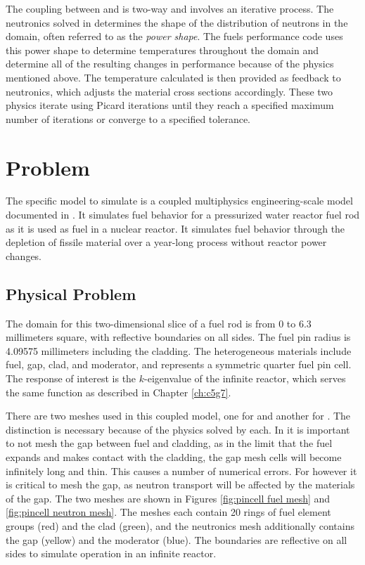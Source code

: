 The coupling between \rattlesnake{} and \bison{} is two-way and involves an iterative process.  The neutronics
solved in \rattlesnake{} determines the shape of the distribution of neutrons in the domain, often referred to
as the \emph{power shape}.  The fuels performance code uses this power shape to determine temperatures
throughout the domain and determine all of the resulting changes in performance because of the physics
mentioned above.  The temperature calculated is then provided as feedback to neutronics, which adjusts the
material cross sections accordingly.  These two physics iterate using Picard iterations until they reach a
specified maximum number of iterations or converge to a specified tolerance.

\section{Problem}

The specific model to simulate is a coupled multiphysics engineering-scale model documented in \cite{physormammoth}.  
It simulates fuel behavior for a pressurized
water reactor fuel rod as it is used as fuel in a nuclear reactor.  It simulates fuel behavior through the 
depletion of fissile material over a year-long process without reactor power changes.

\subsection{Physical Problem}
The domain for this two-dimensional slice of a fuel rod is from 0 to 6.3 millimeters square, with reflective
boundaries on all sides.
The fuel pin radius is 4.09575 millimeters including the cladding.
The heterogeneous materials include fuel, gap, clad, and
moderator, and represents a symmetric quarter fuel pin cell.  
The response of interest is the $k$-eigenvalue of the infinite reactor, which serves the same function as
described in Chapter \ref{ch:c5g7}.

There are two meshes used in this coupled model, one for \bison{} and another for \rattlesnake{}.  The distinction is
necessary because of the physics solved by each.  In \bison{} it is important to not mesh the gap between fuel
and cladding, as in the limit that the fuel expands and makes contact with the cladding, the gap mesh cells
will become infinitely long and thin.  This causes a number of numerical errors.  For \rattlesnake{} however
it is critical to mesh the gap, as neutron transport will be affected by the materials of the gap.  The two
meshes are shown in Figures \ref{fig:pincell fuel mesh} and \ref{fig:pincell neutron mesh}.
The meshes each contain 20 rings of fuel element groups (red) and the clad (green),
and the neutronics mesh additionally contains the gap (yellow) and the moderator (blue).  
The boundaries are reflective on all sides to simulate operation in an infinite reactor.

